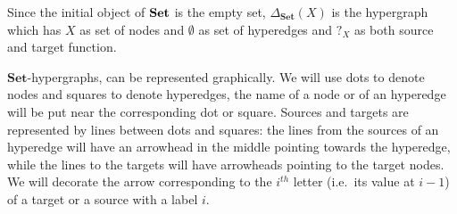 \documentclass[runningheads,envcountsect]{llncs}
\newcommand{\Set}{\mathbf{Set}}
\newcommand{\catname}[1]{\textbf{\textup{#1}}}
\begin{document}
\begin{example}Since the initial object of $\catname{Set}$ is the empty set,  $\Delta_{\Set}(X)$ is the hypergraph which has $X$ as set of nodes and $\emptyset$ as set of hyperedges and $?_X$ as both source and target function.
\end{example}


$\Set$-hypergraphs,  can be represented graphically. We will use dots to denote nodes and squares to denote hyperedges, the name of a node or of an hyperedge will be put near the corresponding dot or square. Sources and targets are represented by lines between dots and squares: the lines from the sources of an hyperedge will have an arrowhead in the middle pointing towards the hyperedge, while the lines to the targets will have arrowheads pointing to the target nodes.  We will decorate the arrow corresponding to the $i^{th}$ letter (i.e.~its value at $i-1$) of a target or a source with a label $i$.
\end{document}
